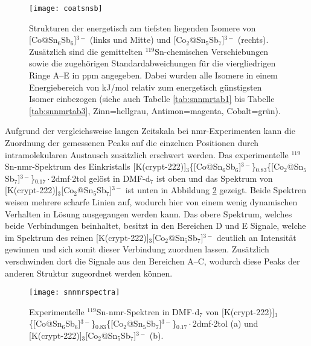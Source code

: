 \begin{figure}[ht!]
	\centering
	\texttt{[image: coatsnsb]}
	\captionsetup{figurewithin = chapter}
	\captionsetup{font=small, labelfont=bf}\caption[Strukturen von {[Co@Sn$_6$Sb$_6$]$^{3-}$ und [Co$_2$@Sn$_5$Sb$_7$]$^{3-}$}]{Strukturen der energetisch am tiefsten liegenden Isomere von [Co@Sn$_6$Sb$_6$]$^{3-}$ (links und Mitte) und [Co$_2$@Sn$_5$Sb$_7$]$^{3-}$ (rechts). Zusätzlich sind die gemittelten $^{119}$Sn-chemischen Verschiebungen sowie die zugehörigen Standardabweichungen für die viergliedrigen Ringe A--E in ppm angegeben. Dabei wurden alle Isomere in einem Energiebereich von \unit[10]{kJ/mol} relativ zum energetisch günstigsten Isomer einbezogen (siehe auch Tabelle \ref{tab:snnmrtab1} bis Tabelle \ref{tab:snnmrtab3}, Zinn=hellgrau, Antimon=magenta, Cobalt=grün).}
\label{abb:coatsnsb}
\end{figure}
\FloatBarrier
Aufgrund der vergleichsweise langen Zeitskala bei \ac{nmr}-Experimenten kann die Zuordnung der gemessenen Peaks auf die einzelnen Positionen durch intramolekularen Austausch zusätzlich erschwert werden. Das experimentelle $^{119}$Sn-\ac{nmr}-Spektrum des Einkristalls [K(crypt-222)]$_3$\{[Co@Sn$_6$Sb$_6$]$^{3-}$\}$_{0.83}$\{[Co$_2$@Sn$_5$Sb$_7$]$^{3-}$\}$_{0.17}\cdot$2dmf$\cdot$2tol gelöst in DMF-d$_7$ ist oben und das Spektrum von [K(crypt-222)]$_3$[Co$_2$@Sn$_5$Sb$_7$]$^{3-}$ ist unten in Abbildung \ref{abb:expsnnmr} gezeigt. Beide Spektren weisen mehrere scharfe Linien auf, wodurch hier von einem wenig dynamischen Verhalten in Lösung ausgegangen werden kann. Das obere Spektrum, welches beide Verbindungen beinhaltet, besitzt in den Bereichen D und E Signale, welche im Spektrum des reinen [K(crypt-222)]$_3$[Co$_2$@Sn$_5$Sb$_7$]$^{3-}$ deutlich an Intensität gewinnen und sich somit dieser Verbindung zuordnen lassen. Zusätzlich verschwinden dort die Signale aus den Bereichen A--C, wodurch diese Peaks der anderen Struktur zugeordnet werden können. 
\begin{figure}[ht!]
	\centering
	\texttt{[image: snnmrspectra]}
	\captionsetup{figurewithin = chapter}
	\captionsetup{font=small, labelfont=bf}\caption[{$^{119}$Sn-\ac{nmr}-Spektren von [Co@Sn$_6$Sb$_6$]$^{3-}$ und [Co$_2$@Sn$_5$Sb$_7$]$^{3-}$}]{Experimentelle $^{119}$Sn-\ac{nmr}-Spektren in DMF-d$_7$ von [K(crypt-222)]$_3$\{[Co@Sn$_6$Sb$_6$]$^{3-}$\}$_{0.83}$\{[Co$_2$@Sn$_5$Sb$_7$]$^{3-}$\}$_{0.17}\cdot$2dmf$\cdot$2tol \textsf{(a)} und [K(crypt-222)]$_3$[Co$_2$@Sn$_5$Sb$_7$]$^{3-}$ \textsf{(b)}.}
\label{abb:expsnnmr}
\end{figure}
\FloatBarrier

